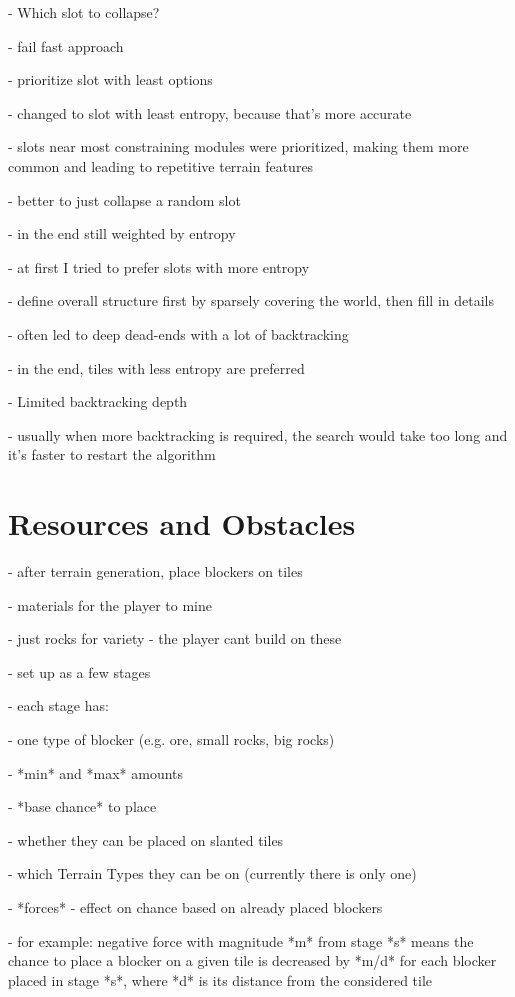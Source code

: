 - Which slot to collapse?

- fail fast approach

- prioritize slot with least options

- changed to slot with least entropy, because that's more accurate

- slots near most constraining modules were prioritized, making them more common and leading to repetitive terrain features

- better to just collapse a random slot

- in the end still weighted by entropy

- at first I tried to prefer slots with more entropy

- define overall structure first by sparsely covering the world, then fill in details

- often led to deep dead-ends with a lot of backtracking

- in the end, tiles with less entropy are preferred

- Limited backtracking depth

- usually when more backtracking is required, the search would take too long and it's faster to restart the algorithm

\section{Resources and Obstacles}

- after terrain generation, place blockers on tiles

- materials for the player to mine

- just rocks for variety - the player cant build on these

- set up as a few stages

- each stage has:

- one type of blocker (e.g. ore, small rocks, big rocks)

- *min* and *max* amounts

- *base chance* to place

- whether they can be placed on slanted tiles

- which Terrain Types they can be on (currently there is only one)

- *forces* - effect on chance based on already placed blockers

- for example: negative force with magnitude *m* from stage *s* means the chance to place a blocker on a given tile is decreased by *m/d*  for each blocker placed in stage *s*, where *d* is its distance from the considered tile

